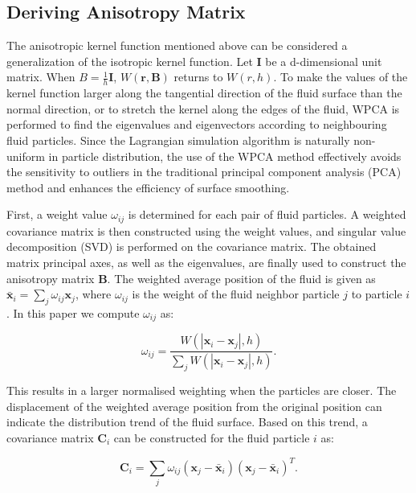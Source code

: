 \documentclass[times,twocolumn,final]{elsarticle}
\begin{document}
\subsection{Deriving Anisotropy Matrix}
The anisotropic kernel function mentioned above can be considered a generalization of the isotropic kernel function. Let $\mathbf{I}$ be a d-dimensional unit matrix. When $B=\frac 1 h \mathbf{I}$, $W(\mathbf{r},\mathbf{B})$ returns to $W(r,h)$. To make the values of the kernel function larger along the tangential direction of the fluid surface than the normal direction, or to stretch the kernel along the edges of the fluid, WPCA\cite{ref:ref30} is performed to find the eigenvalues and eigenvectors according to neighbouring fluid particles. Since the Lagrangian simulation algorithm is naturally non-uniform in particle distribution, the use of the WPCA method effectively avoids the sensitivity to outliers in the traditional principal component analysis (PCA) method and enhances the efficiency of surface smoothing.

First, a weight value $\omega_{ij}$ is determined for each pair of fluid particles. A weighted covariance matrix is then constructed using the weight values, and singular value decomposition (SVD) is performed on the covariance matrix. The obtained matrix principal axes, as well as the eigenvalues, are finally used to construct the anisotropy matrix $\mathbf{B}$. The weighted average position of the fluid is given as $\bar{\mathbf{x}}_{i}=\sum_{j} \omega_{ij} \mathbf{x}_{j}$, where $\omega_{ij}$ is the weight of the fluid neighbor particle $j$ to particle $i$. In this paper we 
compute $\omega_{i j}$ as:

\begin{equation}
\omega_{i j}=\frac{W\left(\left|\mathbf{x}_{i}-\mathbf{x}_{j}\right|, h\right)}{\sum_{j} W\left(\left|\mathbf{x}_{i}-\mathbf{x}_{j}\right|, h\right)}.\label{con:equa11}
\end{equation}

This results in a larger normalised weighting when the particles are closer. The displacement of the weighted average position from the original position can indicate the distribution trend of the fluid surface. Based on this trend, a covariance matrix $\mathbf{C}_i$ can be constructed for the fluid particle $i$ as:

\begin{equation}
\mathbf{C}_{i}=\sum_{j} \omega_{i j}\left(\mathbf{x}_{j}-\bar{\mathbf{x}}_{i}\right)\left(\mathbf{x}_{j}-\bar{\mathbf{x}}_{i}\right)^{T}\label{con:equa12}.
\end{equation}
\end{document}
